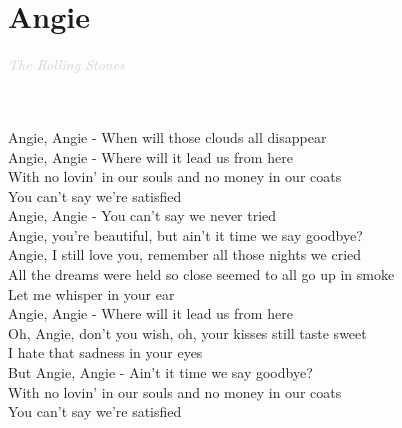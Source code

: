\documentclass[a5paper, 10pt]{book}
\begin{document}
\section{Angie }\textcolor{lightgray}{\textit{The Rolling Stones}}\\~\\
\begin{minipage}[t]{0.8\textwidth}
  ~ \\
  Angie, Angie - When will those clouds all disappear\\
  Angie, Angie - Where will it lead us from here\\

  \hspace*{2mm} With no lovin' in our souls and no money in our coats\\
  \hspace*{2mm} You can't say we're satisfied\\

  Angie, Angie - You can't say we never tried\\

  Angie, you're beautiful, but ain't it time we say goodbye?\\
  Angie, I still love you, remember all those nights we cried\\

  \hspace*{2mm} All the dreams were held so close seemed to all go up in smoke\\
  \hspace*{2mm} Let me whisper in your ear\\

  Angie, Angie - Where will it lead us from here\\

  \hspace*{2mm} Oh, Angie, don't you wish, oh, your kisses still taste sweet\\
  \hspace*{2mm} I hate that sadness in your eyes\\

  But Angie, Angie - Ain't it time we say goodbye?\\

  \hspace*{2mm} With no lovin' in our souls and no money in our coats\\
  \hspace*{2mm} You can't say we're satisfied\\


\end{minipage}
\end{document}
